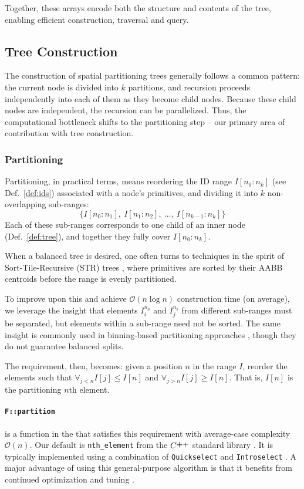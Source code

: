 Together, these arrays encode both the structure and contents
of the tree, enabling efficient construction, traversal and query.




\subsection{Tree Construction}

The construction of spatial partitioning trees generally
follows a common pattern: the current node is divided into
$k$ partitions, and recursion proceeds independently into
each of them as they become child nodes. Because these
child nodes are independent, the recursion can be
parallelized. Thus, the computational bottleneck shifts to
the partitioning step -- our primary area of contribution
with tree construction.

\subsubsection{Partitioning}

Partitioning, in practical terms, means reordering the ID
range $I[n_0:n_k]$ (see Def.~\ref{def:ids}) associated with a
node’s primitives, and dividing it into $k$ non-overlapping
sub-ranges:
\[
	\{I[n_0:n_1],\ I[n_1:n_2],\ \dots,\ I[n_{k-1}:n_k]\}
\]
Each of these sub-ranges corresponds to one child of an
inner node (Def.~\ref{def:tree}), and together they fully
cover $I[n_0:n_k]$.

When a balanced tree is desired, one often turns to
techniques in the spirit of Sort-Tile-Recursive (STR) trees
\cite{str-tree}, where primitives are sorted by their AABB
centroids before the range is evenly partitioned.

To improve upon this and achieve $\mathcal{O}(n\log n)$
construction time (on average), we leverage the insight
that elements $I_i^{n_a}$ and $I_j^{n_b}$ from different
sub-ranges must be separated, but elements within a
sub-range need not be sorted. The same insight is commonly
used in binning-based partitioning approaches \cite{bvh-survey},
though they do not guarantee balanced splits.

The requirement, then, becomes: given a position $n$ in
the range $I$, reorder the elements such that
$\forall_{j<n}I[j] \le I[n]$ and $\forall_{j>n}I[j] \ge I[n]$.
That is, $I[n]$ is the partitioning $n$th element.

\paragraph*{\texttt{F::partition}} is a function in the
that satisfies this requirement
with average-case complexity $\mathcal{O}(n)$. Our default is
\texttt{nth\_element} from the
$\cpp$ standard library \cite{nth-element}.
It is typically implemented using a
combination of \texttt{Quickselect} \cite{quickselect0} and
\texttt{Introselect} \cite{introselect0}. A major advantage
of using this general-purpose algorithm is that it benefits
from continued optimization and tuning
\cite{quickselect1, introselect1, selection}.

